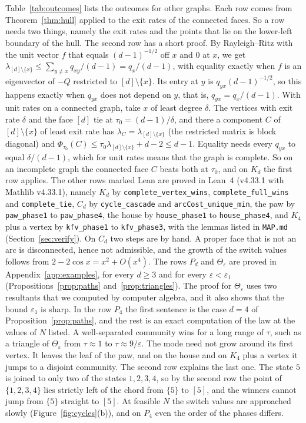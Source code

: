 \begin{remark}\label{rem:outcomes}
Table~\ref{tab:outcomes} lists the outcomes for other graphs. Each row comes
from Theorem~\ref{thm:hull} applied to the exit rates of the connected faces.
So a row needs two things, namely the exit rates and the points that lie on
the lower-left boundary of the hull. The second row has a short proof. By
Rayleigh--Ritz with the unit vector $f$ that equals $(d-1)^{-1/2}$ off $x$ and
$0$ at $x$, we get $\lambda_{[d]\setminus\{x\}}\le\sum_{y\ne x}q_{xy}/(d-1)=q_x/(d-1)$,
with equality exactly when $f$ is an eigenvector of $-Q$ restricted to
$[d]\setminus\{x\}$. Its entry at $y$ is $q_{yx}(d-1)^{-1/2}$, so this happens
exactly when $q_{yx}$ does not depend on $y$, that is, $q_{yx}=q_x/(d-1)$. With
unit rates on a connected graph, take $x$ of least degree $\delta$. The vertices
with exit rate $\delta$ and the face $[d]$ tie at $\tau_0=(d-1)/\delta$, and
there a component $C$ of $[d]\setminus\{x\}$ of least exit rate has
$\lambda_C=\lambda_{[d]\setminus\{x\}}$ (the restricted matrix is block diagonal)
and $\Phi_{\tau_0}(C)\le\tau_0\lambda_{[d]\setminus\{x\}}+d-2\le d-1$. Equality
needs every $q_{yx}$ to equal $\delta/(d-1)$, which for unit rates means that the
graph is complete. So on an incomplete graph the connected face $C$ beats both at
$\tau_0$, and on $K_d$ the first row applies. The other rows marked Lean are proved in Lean~4 (v4.33.1 with Mathlib
v4.33.1), namely $K_d$ by \texttt{complete\_vertex\_wins},
\texttt{complete\_full\_wins} and \texttt{complete\_tie}, $C_d$ by
\texttt{cycle\_cascade} and \texttt{arcCost\_unique\_min}, the paw by
\texttt{paw\_phase1} to \texttt{paw\_phase4}, the house by \texttt{house\_phase1} to
\texttt{house\_phase4}, and $K_4$ plus a vertex by \texttt{kfv\_phase1} to
\texttt{kfv\_phase3}, with the lemmas listed in \nolinkurl{MAP.md}
(Section~\ref{sec:verify}). On $C_d$ two steps are by hand. A proper face that
is not an arc is disconnected, hence not admissible, and the growth of the
switch values follows from $2-2\cos x=x^2+O(x^4)$. The rows $P_d$ and
$\Theta_\varepsilon$ are proved in Appendix~\ref{app:examples}, for every
$d\ge3$ and for every $\varepsilon<\varepsilon_1$
(Propositions~\ref{prop:paths} and~\ref{prop:triangles}). The proof for
$\Theta_\varepsilon$ uses two resultants that we computed by computer algebra,
and it also shows that the bound $\varepsilon_1$ is sharp. In the row $P_4$ the
first sentence is the case $d=4$ of Proposition~\ref{prop:paths}, and the rest
is an exact computation of the law at the values of $N$ listed. A
well-separated community wins for a
long range of $\tau$, such as a triangle of $\Theta_\varepsilon$ from
$\tau\approx1$ to $\tau\approx9/\varepsilon$. The mode need not grow around its
first vertex. It leaves the leaf of the paw, and on the house and on $K_4$ plus
a vertex it jumps to a disjoint community. The second row explains the last
one. The state $5$ is joined to only two of the states $1,2,3,4$, so by the
second row the point of
$\{1,2,3,4\}$ lies strictly left of the chord from $\{5\}$ to $[5]$, and the
winners cannot jump from $\{5\}$ straight to $[5]$. At
feasible $N$ the switch values are approached slowly
(Figure~\ref{fig:cycles}(b)), and on $P_4$ even the order of the phases
differs.
\end{remark}
